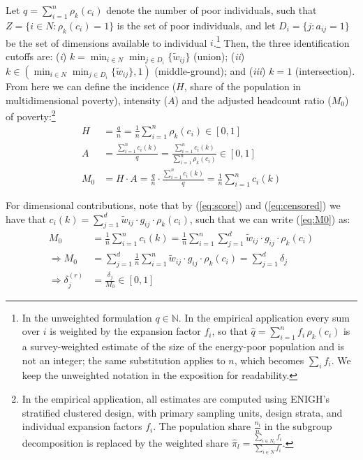 \documentclass[11pt, a4paper]{article}
\begin{document}
Let $q=\sum_{i=1}^n \rho_k(c_i)$ denote the number of poor individuals, such that $Z = \{ i \in N : \rho_k(c_i) = 1 \}$ is the set of poor individuals, and let $D_i=\{j : a_{ij}=1\}$ be the set of dimensions available to individual $i$.\footnote{In the unweighted formulation $q\in\mathbb{N}$. In the empirical application every sum over $i$ is weighted by the expansion factor $f_i$, so that $\hat q=\sum_{i=1}^n f_i\,\rho_k(c_i)$ is a survey-weighted estimate of the size of the energy-poor population and is not an integer; the same substitution applies to $n$, which becomes $\sum_i f_i$. We keep the unweighted notation in the exposition for readability.} Then, the three identification cutoffs are: (\textit{i}) $k = \min_{i \in N} \min_{j \in D_i} \{\tilde{w}_{ij}\} $ (union); (\textit{ii})
$k \in \left(\min_{i\in N}\min_{j\in D_i}\{\tilde{w}_{ij}\}, 1 \right)$ (middle-ground); and (\textit{iii}) $k = 1$ (intersection). From here we can define the incidence ($H$, share of the population in multidimensional poverty), intensity ($A$) and the adjusted headcount ratio ($M_0$) of poverty:\footnote{In the empirical application, all estimates are computed using ENIGH's stratified clustered design, with primary sampling units, design strata, and individual expansion factors $f_i$. The population share $\frac{n_l}{n}$ in the subgroup decomposition is replaced by the weighted share $\hat{\pi}_l=\frac{\sum_{i\in N_l}f_i}{\sum_{i\in N}f_i}$.} \begin{align}
    H&=\frac{q}{n}=\frac{1}{n}\sum_{i=1}^n\rho_k(c_i)\in [0,1] \label{eq:H} \\
    A&=\frac{\sum_{i=1}^nc_i(k)}{q}=\frac{\sum_{i=1}^nc_i(k)}{\sum_{i=1}^n\rho_k(c_i)}\in [0,1] \label{eq:A} \\
    M_0 &= H\cdot A=\frac{q}{n}\cdot \frac{\sum_{i=1}^nc_i(k)}{q}=\frac{1}{n}\sum_{i=1}^nc_i(k)
    \label{eq:M0}
\end{align}

For dimensional contributions, note that by (\ref{eq:score}) and (\ref{eq:censored}) we have that $c_i(k)=\sum_{j=1}^d\tilde{w}_{ij}\cdot g_{ij} \cdot \rho_k(c_i)$, such that we can write (\ref{eq:M0}) as:\begin{align}
    M_0&=\frac{1}{n}\sum_{i=1}^nc_i(k)=\frac{1}{n}\sum_{i=1}^n \sum_{j=1}^d\tilde{w}_{ij}\cdot g_{ij} \cdot \rho_k(c_i) \nonumber \\
    \Rightarrow M_0&=\sum_{j=1}^d\frac{1}{n}\sum_{i=1}^n \tilde{w}_{ij}\cdot g_{ij} \cdot \rho_k(c_i)=\sum_{j=1}^d\delta_j \label{eq:delta} \\
   \Rightarrow \delta^{(r)}_j&=\frac{\delta_j}{M_0}\in [0,1] \label{eq:deltarel}
\end{align}
\end{document}
